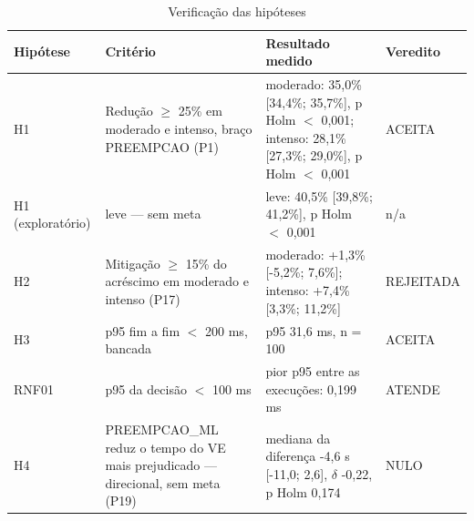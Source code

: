 \begin{table}[htbp]
\centering
\caption{Verificação das hipóteses}
\label{tab:t6}
\small
\begin{tabular}{llll}
\toprule
Hipótese & Critério & Resultado medido & Veredito \\
\midrule
H1 & Redução $\geq$ 25\% em moderado e intenso, braço PREEMPCAO (P1) & moderado: 35,0\% [34,4\%; 35,7\%], p Holm $<$ 0,001; intenso: 28,1\% [27,3\%; 29,0\%], p Holm $<$ 0,001 & ACEITA \\
H1 (exploratório) & leve — sem meta & leve: 40,5\% [39,8\%; 41,2\%], p Holm $<$ 0,001 & n/a \\
H2 & Mitigação $\geq$ 15\% do acréscimo em moderado e intenso (P17) & moderado: +1,3\% [-5,2\%; 7,6\%]; intenso: +7,4\% [3,3\%; 11,2\%] & REJEITADA \\
H3 & p95 fim a fim $<$ 200 ms, bancada & p95 31,6 ms, n = 100 & ACEITA \\
RNF01 & p95 da decisão $<$ 100 ms & pior p95 entre as execuções: 0,199 ms & ATENDE \\
H4 & PREEMPCAO\_ML reduz o tempo do VE mais prejudicado — direcional, sem meta (P19) & mediana da diferença -4,6 s [-11,0; 2,6], $\delta$ -0,22, p Holm 0,174 & NULO \\
\bottomrule
\end{tabular}
\end{table}
